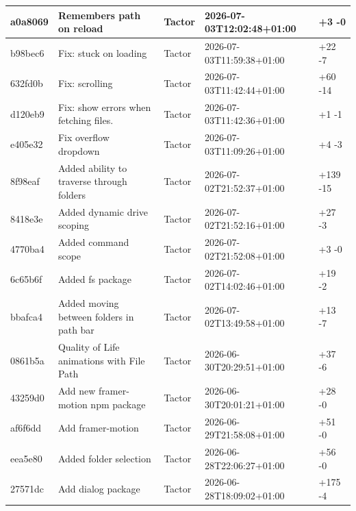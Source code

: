 \documentclass[11pt,a4paper]{full-example-report}
\begin{document}
\begin{table}[h]
\begin{tabularx}{\textwidth}{lllll}
a0a8069 & Remembers path on reload & Tactor & 2026-07-03T12:02:48+01:00 & \textcolor{insertion}{+3} \textcolor{deletion}{-0} \\ \hline
b98bec6 & Fix: stuck on loading & Tactor & 2026-07-03T11:59:38+01:00 & \textcolor{insertion}{+22} \textcolor{deletion}{-7} \\ \hline
632fd0b & Fix: scrolling & Tactor & 2026-07-03T11:42:44+01:00 & \textcolor{insertion}{+60} \textcolor{deletion}{-14} \\ \hline
d120eb9 & Fix: show errors when fetching files. & Tactor & 2026-07-03T11:42:36+01:00 & \textcolor{insertion}{+1} \textcolor{deletion}{-1} \\ \hline
e405e32 & Fix overflow dropdown & Tactor & 2026-07-03T11:09:26+01:00 & \textcolor{insertion}{+4} \textcolor{deletion}{-3} \\ \hline
8f98eaf & Added ability to traverse through folders & Tactor & 2026-07-02T21:52:37+01:00 & \textcolor{insertion}{+139} \textcolor{deletion}{-15} \\ \hline
8418e3e & Added dynamic drive scoping & Tactor & 2026-07-02T21:52:16+01:00 & \textcolor{insertion}{+27} \textcolor{deletion}{-3} \\ \hline
4770ba4 & Added command scope & Tactor & 2026-07-02T21:52:08+01:00 & \textcolor{insertion}{+3} \textcolor{deletion}{-0} \\ \hline
6c65b6f & Added fs package & Tactor & 2026-07-02T14:02:46+01:00 & \textcolor{insertion}{+19} \textcolor{deletion}{-2} \\ \hline
bbafca4 & Added moving between folders in path bar & Tactor & 2026-07-02T13:49:58+01:00 & \textcolor{insertion}{+13} \textcolor{deletion}{-7} \\ \hline
0861b5a & Quality of Life animations with File Path & Tactor & 2026-06-30T20:29:51+01:00 & \textcolor{insertion}{+37} \textcolor{deletion}{-6} \\ \hline
43259d0 & Add new framer-motion npm package & Tactor & 2026-06-30T20:01:21+01:00 & \textcolor{insertion}{+28} \textcolor{deletion}{-0} \\ \hline
af6f6dd & Add framer-motion & Tactor & 2026-06-29T21:58:08+01:00 & \textcolor{insertion}{+51} \textcolor{deletion}{-0} \\ \hline
eea5e80 & Added folder selection & Tactor & 2026-06-28T22:06:27+01:00 & \textcolor{insertion}{+56} \textcolor{deletion}{-0} \\ \hline
27571dc & Add dialog package & Tactor & 2026-06-28T18:09:02+01:00 & \textcolor{insertion}{+175} \textcolor{deletion}{-4} \\ \hline

\end{tabularx}
\end{table}
\end{document}
